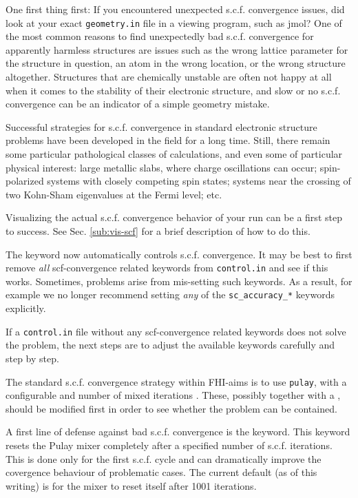 One first thing first: If you encountered unexpected
s.c.f. convergence issues, did look at your exact \texttt{geometry.in}
file in a viewing program, such as jmol? One of the most common
reasons to find unexpectedly bad s.c.f. convergence for apparently
harmless structures are issues such as the wrong lattice parameter for
the structure in question, an atom in the wrong location, or the wrong
structure altogether. Structures that are chemically unstable are
often not happy at all when it comes to the stability of their
electronic structure, and slow or no s.c.f. convergence can be an
indicator of a simple geometry mistake.

Successful strategies for s.c.f. convergence in standard electronic
structure problems have been developed in the field for a long time.
Still, there remain some particular pathological classes of
calculations, and even some of particular physical interest: large
metallic slabs, where charge oscillations can occur; spin-polarized
systems with closely competing spin states; systems near the crossing
of two Kohn-Sham eigenvalues at the Fermi level; etc.

Visualizing the actual s.c.f. convergence behavior of your run can be a first
step to success. See Sec. \ref{sub:vis-scf} for a brief description of how to
do this.

The  keyword now automatically controls
s.c.f. convergence. It may be best to first remove \emph{all}
scf-convergence related keywords from \texttt{control.in} and see if
this works. Sometimes, problems arise from mis-setting such
keywords. As a result, for example we no longer recommend setting
\emph{any} of the \texttt{sc\_accuracy\_*} keywords explicitly.

If a \texttt{control.in} file without any scf-convergence related
keywords does not solve the problem, the next steps are to adjust the
available keywords carefully and step by step.

The standard s.c.f. convergence strategy within FHI-aims is to use
 \texttt{pulay}, with a configurable
 and number of mixed iterations
. These, possibly together with a
, should be modified first in order to see
whether the problem can be contained.

A first line of defense against bad s.c.f. convergence is
the  keyword. This keyword resets the Pulay
mixer completely after a specified number of s.c.f. iterations. This
is done only for the first s.c.f. cycle and can dramatically improve
the covergence behaviour of problematic cases. The current default
(as of this writing) is for the mixer to reset itself after 1001 iterations.


